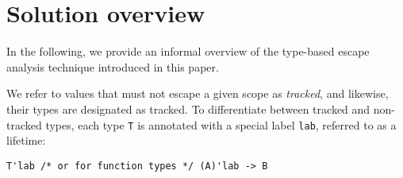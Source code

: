 \documentclass[11pt]{article}
\begin{document}
%






    \section{Solution overview}

    In the following, we provide an informal overview of the type-based escape analysis technique introduced in this paper.

    We refer to values that must not escape a given scope as \textit{tracked}, and likewise, their types are designated as tracked.
    To differentiate between tracked and non-tracked types, each type \lstinline[language=colang]|T| is annotated with a special label \lstinline[language=colang]|lab|, referred to as a lifetime:
    \begin{lstlisting}[language=colang]
        T'lab /* or for function types */ (A)'lab -> B
    \end{lstlisting}
\end{document}
